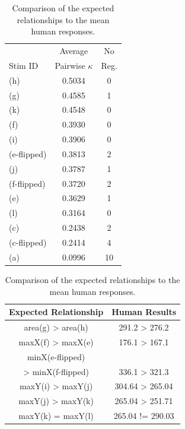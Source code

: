 \documentclass[11pt,letterpaper]{article}
\begin{document}
\begin{table}[t]
\parbox{.50\linewidth}{
\centering 
\begin{tabular}{l c c}
 & Average & No \\
Stim ID & Pairwise $\kappa$ & Reg.\\
\hline
\hline
(h) & 0.5034 & 0\\ %
(g) & 0.4585 & 1\\ %
(k) & 0.4548 & 0\\ %
(f) & 0.3930 & 0\\ %
(i) & 0.3906 & 0\\ %
(e-flipped) & 0.3813 & 2\\ %
(j) & 0.3787 & 1\\ %
(f-flipped) & 0.3720 & 2\\ %
(e) & 0.3629 & 1\\ %
(l) & 0.3164& 0\\ %
(c) & 0.2438 & 2\\ %
(c-flipped) & 0.2414 & 4\\ %
(a) & 0.0996 & 10 \\ %
\hline
\end{tabular}
\caption{The average pairwise $\kappa$ scores and the number of no region response by visual stimulus.}
\label{tab:stimuli-kappa-scores}
}
\hfill
\parbox{.50\linewidth}{
\centering
\begin{tabular}{c c}
Expected Relationship & Human Results  \\
\hline
\hline
area(g) > area(h) & 291.2 > 276.2\footnotemark[2] \\
maxX(f) > maxX(e) & 176.1 > 167.1 \\
minX(e-flipped)  &  \\
 > minX(f-flipped) & 336.1 > 321.3\footnotemark[2] \\
maxY(i) > maxY(j) & 304.64 > 265.04\footnotemark[2] \\
maxY(j) > maxY(k) & 265.04 > 251.71 \\
maxY(k) = maxY(l) & 265.04 != 290.03 \\
\hline
\end{tabular}
\caption{Comparison of the expected relationships to the mean human responses.}
\label{tab:region-location-tests}
}
\end{table}
\end{document}
